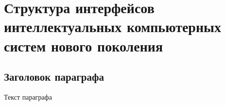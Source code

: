 \chapter{Структура интерфейсов интеллектуальных компьютерных систем нового поколения}
\label{chapter_interfaces}


\section{Заголовок параграфа}
Текст параграфа

%
